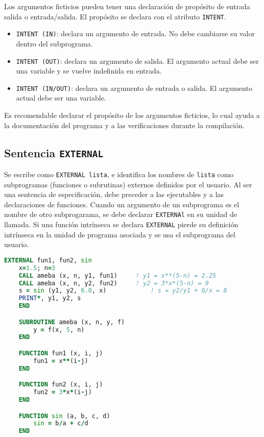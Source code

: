 Los argumentos ficticios pueden tener una declaración de propósito de entrada salida o entrada/salida. El propósito se declara con el atributo {\tt INTENT}. 

\begin{itemize}
	\item {\tt INTENT (IN)}: declara un argumento de entrada. No debe cambiarse su valor dentro del subprograma. 
	\item {\tt INTENT (OUT)}: declara un argumento de salida. El argumento actual debe ser una variable y se vuelve indefinida en entrada.
	\item {\tt INTENT (IN/OUT)}: declara un argumento de entrada o salida. El argumento actual debe ser una variable.
\end{itemize}

Es recomendable declarar el propósito de los argumentos ficticios, lo cual ayuda a la documentación del programa y a las verificaciones durante la compilación.



\subsection{Sentencia {\tt EXTERNAL}}

Se escribe como {\tt EXTERNAL lista}, e identifica los nombres de {\tt lista} como subprogramas (funciones o subrutinas) externos definidos por el usuario. Al ser una sentencia de especificación, debe preceder a las  ejecutables y a las declaraciones de funciones. Cuando un argumento de un subprograma es el nombre de otro subprogarama, se debe declarar {\tt EXTERNAl} en su unidad de llamada. Si una función intrínseca se declara {\tt EXTERNAL} pierde su definición intrínseca en la unidad de programa asociada y se usa el subprograma del usuario. 


\begin{lstlisting}[language=Fortran]
	EXTERNAL fun1, fun2, sin
	x=1.5; n=3
	CALL ameba (x, n, y1, fun1)		! y1 = x**(5-n) = 2.25
	CALL ameba (x, n, y2, fun2)	 	! y2 = 3*x*(5-n) = 9
	s = sin (y1, y2, 6.0, x)			! s = y2/y1 + 6/x = 8
	PRINT*, y1, y2, s
	END

	SUBROUTINE ameba (x, n, y, f)
		y = f(x, 5, n)
	END

	FUNCTION fun1 (x, i, j)
		fun1 = x**(i-j)
	END

	FUNCTION fun2 (x, i, j)
		fun2 = 3*x*(i-j)
	END

	FUNCTION sin (a, b, c, d)
		sin = b/a + c/d
	END
\end{lstlisting}

